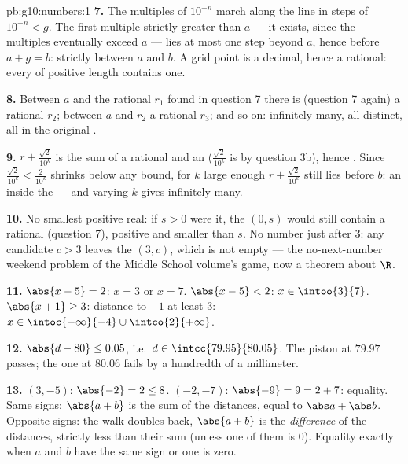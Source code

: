 \begin{solution}{pb:g10:numbers:1}
\textbf{7.} The multiples of $10^{-n}$ march along the line in
steps of $10^{-n} < g$. The first multiple strictly greater
than $a$ --- it exists, since the multiples eventually exceed
$a$ --- lies at most one step beyond $a$, hence before
$a + g = b$: strictly between $a$ and $b$. A grid point is a
decimal, hence a rational: every  of positive length
contains one.

\textbf{8.} Between $a$ and the rational $r_1$ found in
question 7 there is (question 7 again) a rational $r_2$; between
$a$ and $r_2$ a rational $r_3$; and so on: infinitely many, all
distinct, all in the original .

\textbf{9.} $r + \frac{\sqrt2}{10^k}$ is the sum of a rational
and an  ($\frac{\sqrt2}{10^k}$ is  by
question 3b), hence . Since
$\frac{\sqrt2}{10^k} < \frac{2}{10^k}$ shrinks below any bound,
for $k$ large enough $r + \frac{\sqrt2}{10^k}$ still lies
before $b$: an  inside the  --- and varying
$k$ gives infinitely many.

\textbf{10.} No smallest positive real: if $s > 0$ were it, the
 $(0, s)$ would still contain a rational (question 7),
positive and smaller than $s$. No number just after $3$: any
candidate $c > 3$ leaves the  $(3, c)$, which is not
empty --- the no-next-number weekend problem of the Middle School volume's game, now a theorem about
$\R$.

\textbf{11.} $\abs{x - 5} = 2$: $x = 3$ or $x = 7$.
$\abs{x - 5} < 2$: $x \in \intoo{3}{7}$.
$\abs{x + 1} \geq 3$: distance to $-1$ at least $3$:
$x \in \intoc{-\infty}{-4} \cup \intco{2}{+\infty}$.

\textbf{12.} $\abs{d - 80} \leq 0.05$, i.e.\
$d \in \intcc{79.95}{80.05}$. The piston at $79.97$ passes;
the one at $80.06$ fails by a hundredth of a millimeter.

\textbf{13.} $(3, -5)$: $\abs{-2} = 2 \leq 8$. $(-2, -7)$:
$\abs{-9} = 9 = 2 + 7$: equality. Same signs: $\abs{a + b}$ is
the sum of the distances, equal to $\abs a + \abs b$. Opposite
signs: the walk doubles back, $\abs{a + b}$ is the
\emph{difference} of the distances, strictly less than their
sum (unless one of them is $0$). Equality exactly when $a$ and
$b$ have the same sign or one is zero.


\end{solution}
